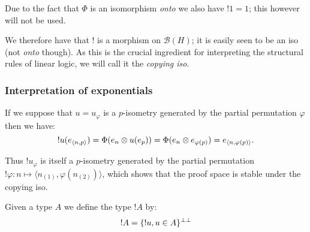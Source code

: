 Due to the fact that \(\Phi\) is an isomorphism \emph{onto} we also have
\(!1=1\); this however will not be used.

We therefore have that \(!\) is a morphism on \(\mathcal{B}(H)\); it is
easily seen to be an iso (not \emph{onto} though). As this is the
crucial ingredient for interpreting the structural rules of linear
logic, we will call it the \emph{copying iso}.

\subsubsection{Interpretation of exponentials}\label{interpretation-of-exponentials}

If we suppose that \(u = u_\varphi\) is a \(p\)-isometry generated by
the partial permutation \(\varphi\) then we have:
\begin{equation*}
!u(e_{\langle n,p\rangle}) = \Phi(e_n\otimes u(e_p)) = \Phi(e_n\otimes e_{\varphi(p)}) = e_{\langle n,\varphi(p)\rangle}.
\end{equation*}

Thus \(!u_\varphi\) is itself a \(p\)-isometry generated by the partial
permutation
\(!\varphi:n\mapsto \langle n_{(1)}, \varphi(n_{(2)})\rangle\), which
shows that the proof space is stable under the copying iso.

Given a type \(A\) we define the type \(!A\) by:
\begin{equation*}
!A = \{!u, u\in A\}^{\bot\bot}
\end{equation*}


